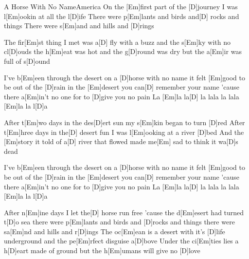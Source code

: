 \documentclass[../main.tex]{subfiles}
\begin{document}
\begin{song}{A Horse With No Name}{America}{}        
On the [Em]first part of the [D]journey
I was l[Em]ookin at all the l[D]ife
There were p[Em]lants and birds and[D] rocks and things
There were s[Em]and and hills and [D]rings

The fir[Em]st thing I met was a[D] fly with a buzz
and the s[Em]ky with no cl[D]ouds
the h[Em]eat was hot and the g[D]round was dry
but the a[Em]ir was full of s[D]ound

I've b[Em]een through the desert on a [D]horse with no name
it felt [Em]good to be out of the [D]rain
in the [Em]desert you can[D] remember your name
'cause there a[Em]in't no one for to [D]give you no pain
La [Em]la   la[D] la lala la lala [Em]la la l[D]a

After t[Em]wo days in the des[D]ert sun
my s[Em]kin began to turn [D]red
After t[Em]hree days in the[D] desert fun
I was l[Em]ooking at a river [D]bed
And the [Em]story it told of a[D] river that flowed
made me[Em] sad to think it wa[D]s dead

I've b[Em]een through the desert on a [D]horse with no name
it felt [Em]good to be out of the [D]rain
in the [Em]desert you can[D] remember your name
'cause there a[Em]in't no one for to [D]give you no pain
La [Em]la   la[D] la lala la lala [Em]la la l[D]a

After n[Em]ine days I let the[D] horse run free
'cause the d[Em]esert had turned t[D]o sea
there were p[Em]lants and birds and [D]rocks and things
there were sa[Em]nd and hills and r[D]ings
The oc[Em]ean is a desert with it's [D]life underground
and the pe[Em]rfect disguise a[D]bove
Under the ci[Em]ties lies a h[D]eart made of ground
but the h[Em]umans will give no [D]love


\end{song}
\end{document}
